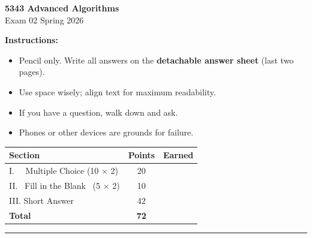 \documentclass[12pt, addpoints]{exam}
\begin{document}
\begin{center}
  {\LARGE\bfseries 5343 Advanced Algorithms}\\[3pt]
  {\large Exam 02 \quad Spring 2026}
\end{center}

\smallskip
\noindent\textbf{Instructions:}
\begin{itemize}[nosep, leftmargin=*, topsep=2pt]
  \item Pencil only. Write all answers on the \textbf{detachable answer sheet} (last two pages).
  \item Use space wisely; align text for maximum readability.
  \item If you have a question, walk down and ask.
  \item Phones or other devices are grounds for failure.
\end{itemize}

\smallskip
\begin{center}
\renewcommand{\arraystretch}{1.35}
\begin{tabular}{|l|c|c|}
  \hline
  \textbf{Section} & \textbf{Points} & \textbf{Earned} \\\hline
  I. \ \ Multiple Choice (10 $\times$ 2) & 20 & \\\hline
  II. \ Fill in the Blank \ (5 $\times$ 2) & 10 & \\\hline
  III. Short Answer & 42 & \\\hline
  \textbf{Total} & \textbf{72} & \\\hline
\end{tabular}
\end{center}

\vspace{6pt}
\noindent\rule{\linewidth}{0.6pt}
\end{document}
